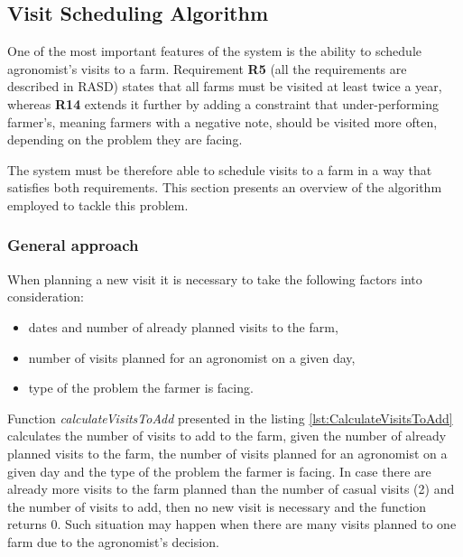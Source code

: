 \subsection{Visit Scheduling Algorithm}\label{subsec:visits-alg}

One of the most important features of the system is the ability to schedule agronomist's visits to a farm. Requirement \textbf{R5} (all the requirements are described in RASD) states that all farms must be visited at least twice a year, whereas \textbf{R14} extends it further by adding a constraint that under-performing farmer's, meaning farmers with a negative note, should be visited more often, depending on the problem they are facing.

The system must be therefore able to schedule visits to a farm in a way that satisfies both requirements. This section presents an overview of the algorithm employed to tackle this problem.

\subsubsection*{General approach}

When planning a new visit it is necessary to take the following factors into consideration:
\begin{itemize}
    \item dates and number of already planned visits to the farm,
    \item number of visits planned for an agronomist on a given day,
    \item type of the problem the farmer is facing.
\end{itemize}

Function \textit{calculateVisitsToAdd} presented in the listing \ref{lst:CalculateVisitsToAdd} calculates the number of visits to add to the farm, given the number of already planned visits to the farm, the number of visits planned for an agronomist on a given day and the type of the problem the farmer is facing. In case there are already more visits to the farm planned than the number of casual visits (2) and the number of visits to add, then no new visit is necessary and the function returns 0. Such situation may happen when there are many visits planned to one farm due to the agronomist's decision.



